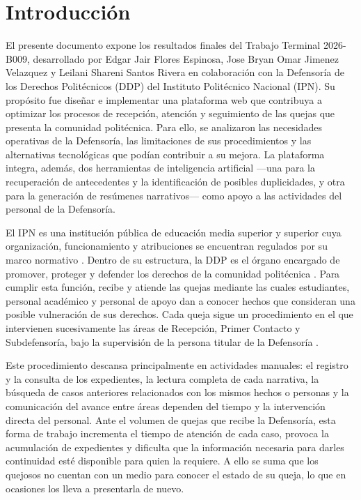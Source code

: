 \chapter*{Introducción}

El presente documento expone los resultados finales del Trabajo Terminal 2026-B009, desarrollado por Edgar Jair Flores Espinosa, Jose Bryan Omar Jimenez Velazquez y Leilani Shareni Santos Rivera en colaboración con la Defensoría de los Derechos Politécnicos (DDP) del Instituto Politécnico Nacional (IPN). Su propósito fue diseñar e implementar una plataforma web que contribuya a optimizar los procesos de recepción, atención y seguimiento de las quejas que presenta la comunidad politécnica. Para ello, se analizaron las necesidades operativas de la Defensoría, las limitaciones de sus procedimientos y las alternativas tecnológicas que podían contribuir a su mejora. La plataforma integra, además, dos herramientas de inteligencia artificial ---una para la recuperación de antecedentes y la identificación de posibles duplicidades, y otra para la generación de resúmenes narrativos--- como apoyo a las actividades del personal de la Defensoría.

El IPN es una institución pública de educación media superior y superior cuya organización, funcionamiento y atribuciones se encuentran regulados por su marco normativo \cite{ipn_ley_organica}. Dentro de su estructura, la DDP es el órgano encargado de promover, proteger y defender los derechos de la comunidad politécnica \cite{ipn_acuerdo622, ipn_manual_organizacion_ddp}. Para cumplir esta función, recibe y atiende las quejas mediante las cuales estudiantes, personal académico y personal de apoyo dan a conocer hechos que consideran una posible vulneración de sus derechos. Cada queja sigue un procedimiento en el que intervienen sucesivamente las áreas de Recepción, Primer Contacto y Subdefensoría, bajo la supervisión de la persona titular de la Defensoría \cite{ipn_manual_procedimientos_ddp}.

Este procedimiento descansa principalmente en actividades manuales: el registro y la consulta de los expedientes, la lectura completa de cada narrativa, la búsqueda de casos anteriores relacionados con los mismos hechos o personas y la comunicación del avance entre áreas dependen del tiempo y la intervención directa del personal. Ante el volumen de quejas que recibe la Defensoría, esta forma de trabajo incrementa el tiempo de atención de cada caso, provoca la acumulación de expedientes y dificulta que la información necesaria para darles continuidad esté disponible para quien la requiere. A ello se suma que los quejosos no cuentan con un medio para conocer el estado de su queja, lo que en ocasiones los lleva a presentarla de nuevo.

